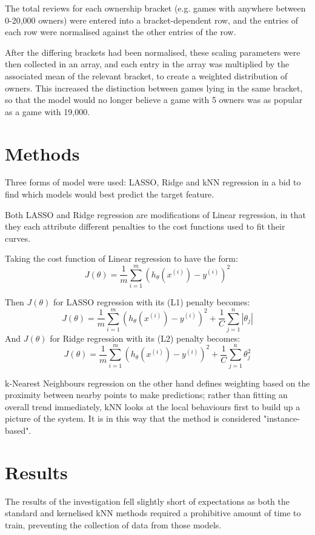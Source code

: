 The total reviews for each ownership bracket (e.g. games with anywhere between 0-20,000 owners) were entered into a bracket-dependent row, and the entries of each row were normalised against the other entries of the row.

After the differing brackets had been normalised, these scaling parameters were then collected in an array, and each entry in the array was multiplied by the associated mean of the relevant bracket, to create a weighted distribution of owners. This increased the distinction between games lying in the same bracket, so that the model would no longer believe a game with 5 owners was as popular as a game with 19,000.

\section{Methods}
Three forms of model were used: LASSO, Ridge and kNN regression in a bid to find which models would best predict the target feature.

Both LASSO and Ridge regression are modifications of Linear regression, in that they each attribute different penalties to the cost functions used to fit their curves.

Taking the cost function of Linear regression to have the form:
\[
J(\theta) = \frac{1}{m} \sum_{i=1}^m (h_{\theta}(x^{(i)}) - y^{(i)})^2
\]

Then $J(\theta)$ for LASSO regression with its (L1) penalty becomes:
\[
J(\theta) = \frac{1}{m} \sum_{i=1}^m (h_{\theta}(x^{(i)}) - y^{(i)})^2 + \frac{1}{C} \sum_{j=1}^n |\theta_j|
\]
And $J(\theta)$ for Ridge regression with its (L2) penalty becomes:
\[
J(\theta) = \frac{1}{m} \sum_{i=1}^m (h_{\theta}(x^{(i)}) - y^{(i)})^2 + \frac{1}{C} \sum_{j=1}^n \theta_j^2
\]

k-Nearest Neighbours regression on the other hand defines weighting based on the proximity between nearby points to make predictions; rather than fitting an overall trend immediately, kNN looks at the local behaviours first to build up a picture of the system. It is in this way that the method is considered "instance-based".

\section{Results}

The results of the investigation fell slightly short of expectations as both the standard and kernelised kNN methods required a prohibitive amount of time to train, preventing the collection of data from those models. %

